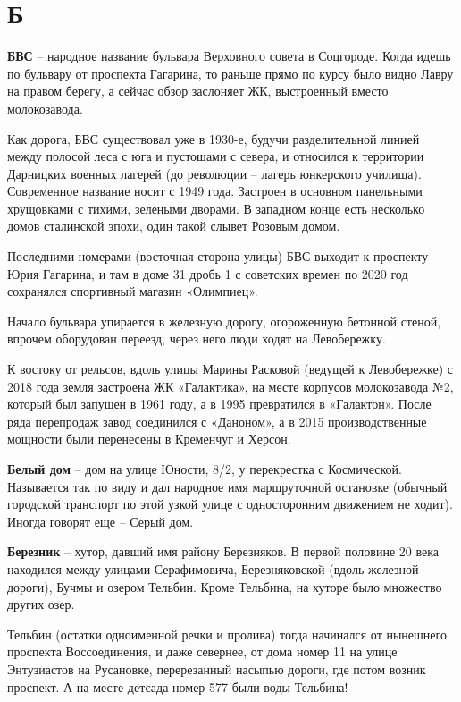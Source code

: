 \chapter*{Б}

\textbf{БВС} – народное название бульвара Верховного совета в Соцгороде. Когда идешь по бульвару от проспекта Гагарина, то раньше прямо по курсу было видно Лавру на правом берегу, а сейчас обзор заслоняет ЖК, выстроенный вместо молокозавода.

Как дорога, БВС существовал уже в 1930-е, будучи разделительной линией между полосой леса с юга и пустошами с севера, и относился к территории Дарницких военных лагерей (до революции – лагерь юнкерского училища). Современное название носит с 1949 года. Застроен в основном панельными хрущовками с тихими, зелеными дворами. В западном конце есть несколько домов сталинской эпохи, один такой слывет Розовым домом.

Последними номерами (восточная сторона улицы) БВС выходит к проспекту Юрия Гагарина, и там в доме 31 дробь 1 с советских времен по 2020 год сохранялся спортивный магазин «Олимпиец».

Начало бульвара упирается в железную дорогу, огороженную бетонной стеной, впрочем оборудован переезд, через него люди ходят на Левобережку.

К востоку от рельсов, вдоль улицы Марины Расковой (ведущей к Левобережке) с 2018 года земля застроена ЖК «Галактика», на месте корпусов молокозавода №2, который был запущен в 1961 году, а в 1995 превратился в «Галактон». После ряда перепродаж завод соединился с «Даноном», а в 2015 производственные мощности были перенесены в Кременчуг и Херсон.\\

\medskip

\textbf{Белый дом} – дом на улице Юности, 8/2, у перекрестка с Космической. Называется так по виду и дал народное имя маршруточной остановке (обычный городской транспорт по этой узкой улице с односторонним движением не ходит). Иногда говорят еще – Серый дом. \\

\medskip

\textbf{Березник} – хутор, давший имя району Березняков. В первой половине 20 века находился между улицами Серафимовича, Березняковской (вдоль железной дороги), Бучмы и озером Тельбин. Кроме Тельбина, на хуторе было множество других озер.

Тельбин (остатки одноименной речки и пролива) тогда начинался от нынешнего проспекта Воссоединения, и даже севернее, от дома номер 11 на улице Энтузиастов на Русановке, перерезанный насыпью дороги, где потом возник проспект. А на месте детсада номер 577 были воды Тельбина!

